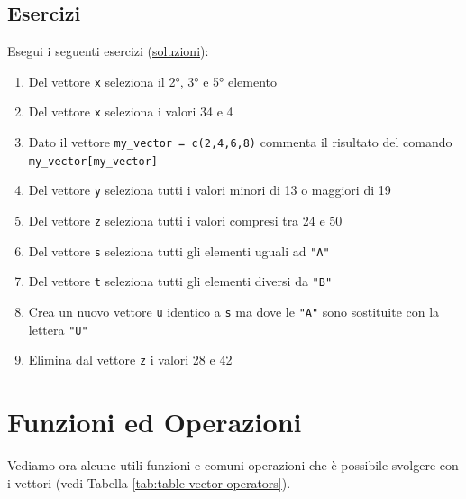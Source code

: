 \documentclass[
]{book}
\providecommand{\tightlist}{%
  \setlength{\itemsep}{0pt}\setlength{\parskip}{0pt}}
\begin{document}
\hypertarget{esercizi-3}{%
\subsection*{Esercizi}\label{esercizi-3}}

Esegui i seguenti esercizi (\href{https://github.com/psicostat/Introduction2R/blob/master/exercises/chapter-07-vectors.R}{soluzioni}):

\begin{enumerate}
\def\labelenumi{\arabic{enumi}.}
\tightlist
\item
  Del vettore \texttt{x} seleziona il 2°, 3° e 5° elemento
\item
  Del vettore \texttt{x} seleziona i valori 34 e 4
\item
  Dato il vettore \texttt{my\_vector\ =\ c(2,4,6,8)} commenta il risultato del comando \texttt{my\_vector{[}my\_vector{]}}
\item
  Del vettore \texttt{y} seleziona tutti i valori minori di 13 o maggiori di 19
\item
  Del vettore \texttt{z} seleziona tutti i valori compresi tra 24 e 50
\item
  Del vettore \texttt{s} seleziona tutti gli elementi uguali ad \texttt{"A"}
\item
  Del vettore \texttt{t} seleziona tutti gli elementi diversi da \texttt{"B"}
\item
  Crea un nuovo vettore \texttt{u} identico a \texttt{s} ma dove le \texttt{"A"} sono sostituite con la lettera \texttt{"U"}
\item
  Elimina dal vettore \texttt{z} i valori 28 e 42
\end{enumerate}

\hypertarget{vector-functions}{%
\section{Funzioni ed Operazioni}\label{vector-functions}}

Vediamo ora alcune utili funzioni e comuni operazioni che è possibile svolgere con i vettori (vedi Tabella \ref{tab:table-vector-operators}).
\end{document}
